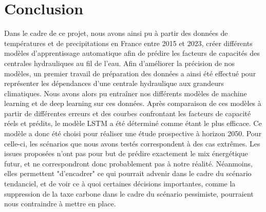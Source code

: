 \documentclass{article}
\theoremstyle{nopointbreak}
\theoremstyle{nobrkbold}
\begin{document}
\section{Conclusion}
Dans le cadre de ce projet, nous avons ainsi pu à partir des données de températures et de precipitations en France 
entre 2015 et 2023, créer différents modèles d'apprentissage automatique 
afin de prédire les facteurs de capacités des centrales hydrauliques au fil de l'eau. 
Afin d'améliorer la précision de nos modèles, un premier travail de préparation des données a ainsi été effectué pour 
représenter les dépendances d'une centrale hydraulique aux grandeurs climatiques. Nous avons alors pu entraîner 
nos différents modèles de machine learning et de deep learning sur ces données. 
Après comparaison de ces modèles à partir de différentes erreurs et des courbes confrontant les facteurs de capacité 
réels et prédits, le modèle LSTM a été déterminé comme étant le plus efficace. 
Ce modèle a donc été choisi pour réaliser une étude prospective à horizon 2050. 
Pour celle-ci, les scénarios que nous avons testés correspondent à des cas extrêmes. 
Les issues proposées n'ont pas pour but de prédire exactement le mix énergétique futur, 
et ne correspondront donc probablement pas à notre réalité.
Néanmoins, elles permettent "d'encadrer" ce qui pourrait advenir dans le cadre du scénario tendanciel, et de voir ce à quoi certaines décisions importantes, 
comme la suppression de la taxe carbone dans le cadre du scénario pessimiste, pourraient nous contraindre à mettre en place.

\newpage

\nocite{*}
\printbibliography
\end{document}
